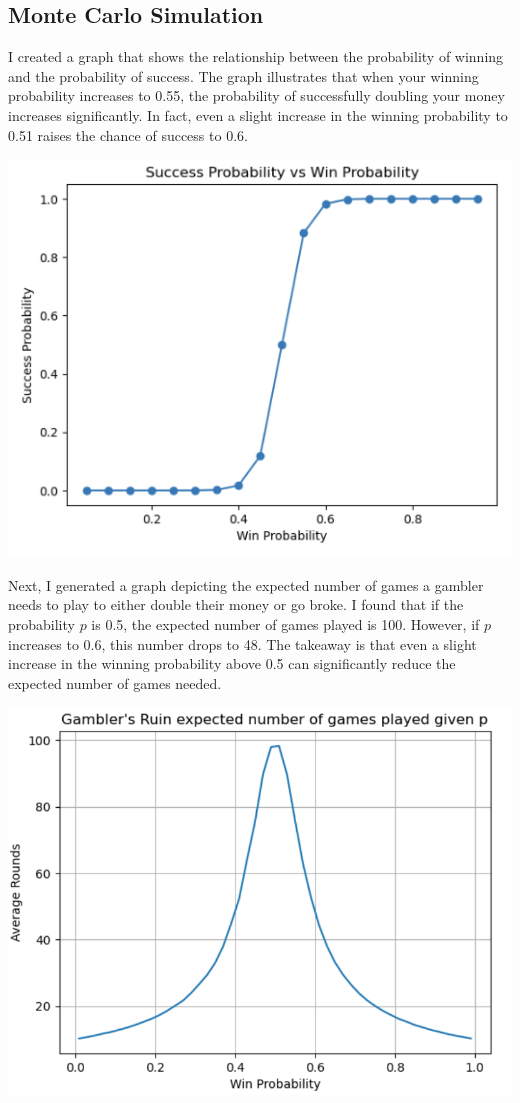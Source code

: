 \documentclass{article}
\begin{document}
\subsection{Monte Carlo Simulation}
I created a graph that shows the relationship between the probability of winning and the probability of success. The graph illustrates that when your winning probability increases to 0.55, the probability of successfully doubling your money increases significantly. In fact, even a slight increase in the winning probability to 0.51 raises the chance of success to 0.6.
\begin{center}
    \includegraphics[scale=1]{p1.PNG}    
\end{center}

Next, I generated a graph depicting the expected number of games a gambler needs to play to either double their money or go broke. I found that if the probability \(p\) is 0.5, the expected number of games played is 100. However, if \(p\) increases to 0.6, this number drops to 48. The takeaway is that even a slight increase in the winning probability above 0.5 can significantly reduce the expected number of games needed.

\begin{center}
    \includegraphics[scale=1]{p2.PNG}    
\end{center}
\end{document}
